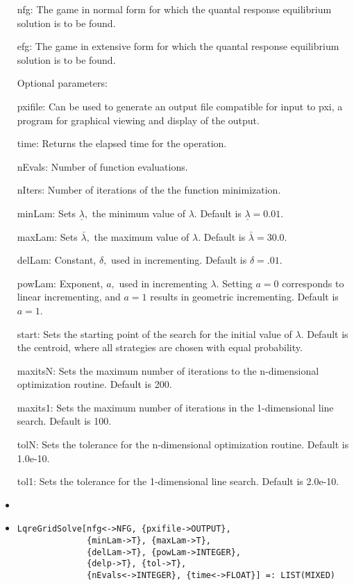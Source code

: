 \begin{itemize}
\bd
\item
[nfg:] The game in normal form for which the quantal response
equilibrium solution is to be
found.
\item	
[efg:] The game in extensive form for which the quantal response
equilibrium solution is to be found.
\ed

\item
[Optional parameters:]\hfil\null

\bd
\item
[pxifile:] Can be used to generate an output file compatible for input
to pxi, a program for graphical viewing and display of the output.  
\item
[time:] Returns the elapsed time for the operation.
\item
[nEvals:] Number of function evaluations.
\item
[nIters:] Number of iterations of the the function minimization.
\item
[minLam:] Sets $\underline\lambda,$ the minimum value of $\lambda.$
Default is $\underline\lambda = 0.01$.
\item
[maxLam:] Sets $\bar\lambda,$ the maximum value of $\lambda.$  Default is
$\bar\lambda = 30.0.$
\item
[delLam:]  Constant, $\delta,$ used in incrementing.   Default is
$\delta = .01.$
\item
[powLam:] Exponent, $a,$ used in incrementing $\lambda.$  Setting $a = 0$
corresponds to linear incrementing, and $a = 1$ results in geometric
incrementing.  Default is $a = 1$.
\item
[start:] Sets the starting point of the search for the initial value of
$\lambda.$  Default is the centroid, where all strategies are chosen
with equal probability.  
\item
[maxitsN:] Sets the maximum number of iterations to the
n-dimensional optimization routine.  Default is 200.
\item
[maxits1:] Sets the maximum number of iterations in the
1-dimensional line search.  Default is 100.
\item
[tolN:] Sets the tolerance for the n-dimensional optimization
routine.  Default is 1.0e-10.
\item
[tol1:] Sets the tolerance for the 1-dimensional line search.
Default is 2.0e-10.
\item
\ed
\ed

\item
\protect \large \begin{verbatim}
LqreGridSolve[nfg<->NFG, {pxifile->OUTPUT},
              {minLam->T}, {maxLam->T}, 
              {delLam->T}, {powLam->INTEGER}, 
              {delp->T}, {tol->T},
              {nEvals<->INTEGER}, {time<->FLOAT}] =: LIST(MIXED)
\end{verbatim}\normalsize


\end{itemize}
